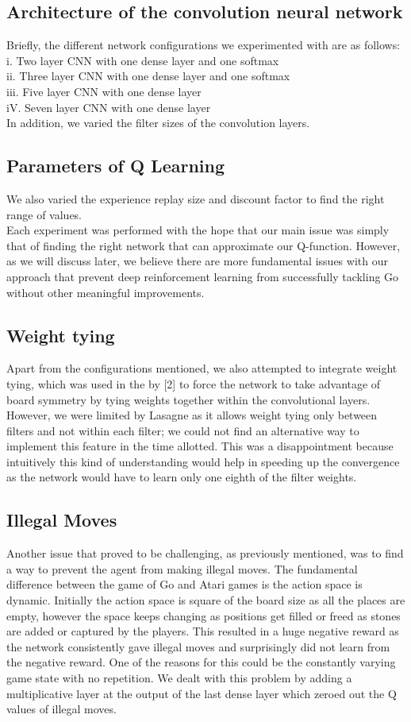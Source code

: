\subsection{Architecture of the convolution neural network}
Briefly, the different network configurations we experimented with are as follows:
\\
i. Two layer CNN with one dense layer and one softmax
\\
ii. Three layer CNN with one dense layer and one softmax
\\
iii. Five layer CNN with one dense layer
\\
iV. Seven layer CNN with one dense layer
\\
In addition, we varied the filter sizes of the convolution layers.
\subsection{Parameters of Q Learning}
We also varied the experience replay size and discount factor to find the right range of values. 
\\
Each experiment was performed with the hope that our main issue was simply that of finding the right network that can approximate our Q-function. However, as we will discuss later, we believe there are more fundamental issues with our approach that prevent deep reinforcement learning from successfully tackling Go without other meaningful improvements.

\subsection{Weight tying}
Apart from the configurations mentioned, we also attempted to integrate weight tying, which was used in the by [2] to force the network to take advantage of board symmetry by tying weights together within the convolutional layers. However, we were limited by Lasagne as it allows weight tying only between filters and not within each filter; we could not find an alternative way to implement this feature in the time allotted. This was a disappointment because intuitively this kind of understanding would help in speeding up the convergence as the network would have to learn only one eighth of the filter weights. 

\subsection{Illegal Moves}
Another issue that proved to be challenging, as previously mentioned, was to find a way to prevent the agent from making illegal moves. The fundamental difference between the game of Go and Atari games is the action space is dynamic. Initially the action space is square of the board size as all the places are empty, however the space keeps changing as positions get filled or freed as stones are added or captured by the players. This resulted in a huge negative reward as the network consistently gave illegal moves and surprisingly did not learn from the negative reward. One of the reasons for this could be the constantly varying game state with no repetition. We dealt with this problem by adding a multiplicative layer at the output of the last dense layer which zeroed out the Q values of illegal moves.  
